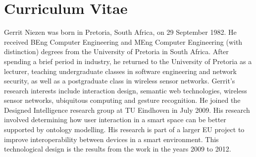 \cleardoublepage

\begingroup
\let\clearpage\relax
\let\cleardoublepage\relax
\let\cleardoublepage\relax

\chapter*{Curriculum Vitae}
Gerrit Niezen was born in Pretoria, South Africa, on 29 September 1982. He received BEng Computer Engineering and MEng Computer Engineering (with distinction) degrees from the University of Pretoria in South Africa. After spending a brief period in industry, he returned to the University of Pretoria as a lecturer, teaching undergraduate classes in software engineering and network security, as well as a postgraduate class in wireless sensor networks. Gerrit's research interests include interaction design, semantic web technologies, wireless sensor networks, ubiquitous computing and gesture recognition. He joined the Designed Intelligence research group at TU Eindhoven in July 2009. His research involved determining how user interaction in a smart space can be better supported by ontology modelling. His research is part of a larger EU project to improve interoperability between devices in a smart environment. This technological design is the results from the work in the years 2009 to 2012.

\endgroup

\vfill